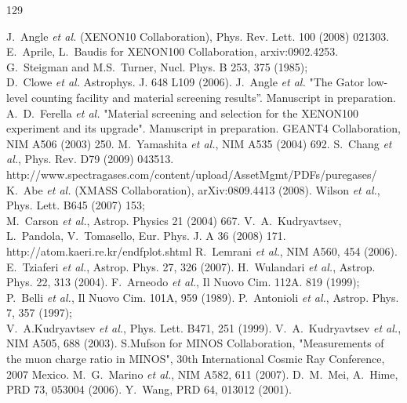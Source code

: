 \newpage
\begin{thebibliography} {129}

 J.~Angle {\it et al.} (XENON10 Collaboration), Phys. Rev. Lett. 100 (2008) 021303.
 E.~Aprile, L.~Baudis for XENON100 Collaboration, arxiv:0902.4253.
 G.~Steigman and M.S.~Turner, Nucl. Phys. B 253, 375 (1985);\\
				D.~Clowe {\it et al.} Astrophys. J. 648 L109 (2006).
 J.~Angle {\it et al.} "The Gator low-level counting facility
and material screening results''. Manuscript in preparation. 
 A.~D.~Ferella {\it et al.} "Material screening and selection for the XENON100 experiment and its upgrade". Manuscript in preparation. 
 GEANT4 Collaboration, NIM A506 (2003) 250.
 M.~Yamashita {\it et al.}, NIM A535 (2004) 692.
 S.~Chang {\it et al.}, Phys. Rev. D79 (2009) 043513.
 http://www.spectragases.com/content/upload/AssetMgmt/PDFs/puregases/
 K.~Abe {\it et al.} (XMASS Collaboration), arXiv:0809.4413 (2008).
 Wilson {\it et al.}, Phys. Lett. B645 (2007) 153;\\
              M.~Carson {\it et al.}, Astrop. Physics 21 (2004) 667.   
 V.~A.~Kudryavtsev, L.~Pandola, V.~Tomasello, Eur. Phys. J. A 36
  (2008) 171. 
 http://atom.kaeri.re.kr/endfplot.shtml
 R.~Lemrani {\it et al.}, NIM A560, 454 (2006).
 E.~Tziaferi {\it et al.}, Astrop. Phys. 27, 326 (2007).
 H.~Wulandari {\it et al.}, Astrop. Phys. 22, 313 (2004).
 F.~Arneodo {\it et al.}, Il Nuovo Cim. 112A. 819 (1999); \\
                      P.~Belli {\it et al.}, Il Nuovo Cim. 101A, 959 (1989).
 P.~Antonioli {\it et al.}, Astrop. Phys. 7, 357 (1997); \\
               V.~A.Kudryavtsev {\it et al.}, Phys. Lett. B471, 251 (1999). 
 V.~A.~Kudryavtsev {\it et al.}, NIM A505, 688 (2003).
 S.Mufson for MINOS Collaboration, "Measurements of the muon
  charge ratio in MINOS", 30th International Cosmic Ray Conference, 2007 Mexico.
 M.~G.~Marino {\it et al.}, NIM A582, 611 (2007).
 D.~M.~Mei, A.~Hime, PRD 73, 053004 (2006).
 Y.~Wang, PRD 64, 013012 (2001).

\end{thebibliography}

